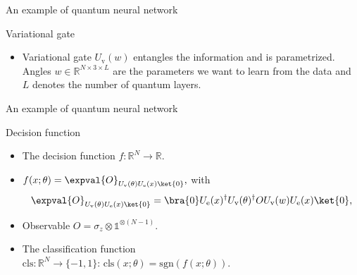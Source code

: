 \begingroup
\nologo
\begin{frame}{An example of quantum neural network}
\begin{block}{Variational gate}
\begin{itemize}
	\item Variational gate $U_{\mathrm{v}}(w)$ entangles the information 
	and is parametrized. 
	Angles $w \in \mathbb{R}^{N \times 3 \times L}$ 
	are the parameters we want to learn from the data 
	and $L$ denotes the number of quantum layers.
\end{itemize}
\end{block}
\begin{figure}
	\centering
\end{figure}
\end{frame}
\endgroup
\begin{frame}{An example of quantum neural network}
\begin{block}{Decision function}
\begin{itemize}
	\item The decision function $f: \mathbb{R}^N \to \mathbb{R}$.
	\item $f(x; \theta) = 
	\expval{O}_{U_{\mathrm{v}}(\theta) U_{\mathrm{e}}(x)\ket{0}},$
	with
	$$\expval{O}_{U_{\mathrm{v}}(\theta) U_{\mathrm{e}}(x)\ket{0}}=
	\bra{0}U_{\mathrm{e}}(x)^\dagger U_{\mathrm{v}}(\theta)^\dagger  
	O U_{\mathrm{v}}(w) U_{\mathrm{e}}(x)\ket{0},$$
	\item Observable $O= \sigma_z \otimes \mathbb{1}^{\otimes (N-1)} $.
	\item The classification function\\ $\mathrm{cls}: \mathbb{R}^N\to \{-1,1\}$:
	 $\mathrm{cls}(x; \theta) = \mathrm{sgn}(f(x; \theta))$.
\end{itemize}	
\end{block}
\end{frame}

